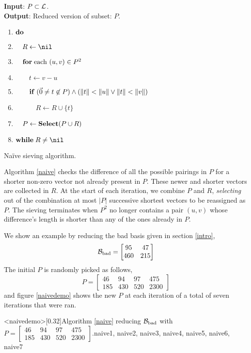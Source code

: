 \documentclass{homework}
\begin{document}
\begin{algorithm}
\begin{flushleft}
    \noindent\textbf{Input}: $P \subset \mathcal{L}$. \\
    \noindent\textbf{Output}: Reduced version of subset: $P.$
  \end{flushleft}
  \begin{enumerate}[label=\arabic*:]
    \item $\mathbf{do\;}$
    \item $\quad R \leftarrow \nil$
    \item $\quad \mathbf{for\;} \text{each } (u, v) \in P^2$
    \item $\quad\quad t \leftarrow v - u$
    \item $\quad\quad \mathbf{if\;} (\vec{0} \neq t \not\in P) \wedge
    (\left\lVert t\right\rVert < \left\lVert u\right\rVert \vee \left\lVert t\right\rVert < \left\lVert v\right\rVert)$
    \item $\quad\quad\quad R \leftarrow R \cup \{t\}$
    \item $\quad P \leftarrow \mathbf{Select}(P \cup R)$
    \item $\WHILE R \neq \nil$
  \end{enumerate}
  \caption{Na\"ive sieving algorithm.}
  \label{naive}
\end{algorithm}

Algorithm \ref{naive} checks the difference of all the possible
pairings in $P$ for a shorter non-zero vector not already present in
$P$. These newer and shorter vectors are collected in $R$. At the
start of each iteration, we combine $P$ and $R$, \textit{selecting}
out of the combination at most $|P|$ successive shortest vectors to be
reassigned as $P$. The sieving terminates when $P^2$ no longer
contains a pair $(u, v)$ whose difference's length is shorter than any
of the ones already in $P$.

We show an example by reducing the bad basis given in section
\ref{intro},
\[
  \mathcal{B}_\text{bad} =
  \begin{bmatrix}
    95  & 47  \\
    460 & 215
  \end{bmatrix}
\]
The initial $P$ is randomly picked as follows,
\[
  P =
  \begin{bmatrix}
    46  & 94  & 97  & 475 \\
    185 & 430 & 520 & 2300
  \end{bmatrix}
\]
and figure \ref{naivedemo} shows the new $P$ at each iteration of a
total of seven iterations that were ran.

\img<naivedemo>[0.32]{Algorithm \ref{naive} reducing
$\mathcal{B}_\text{bad}$ with
$P =
  \begin{bmatrix}
    46  & 94  & 97  & 475 \\
    185 & 430 & 520 & 2300
  \end{bmatrix}
$.}{naive1, naive2, naive3, naive4, naive5, naive6, naive7}
\end{document}
